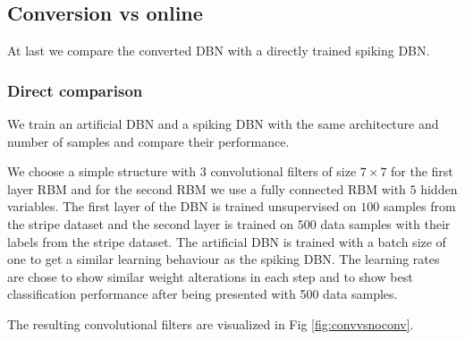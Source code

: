 \subsection{Conversion vs online} \label{c:comparisonexp}

At last we compare the converted DBN with a directly trained spiking DBN.

\subsubsection{Direct comparison}

We train an artificial DBN and a spiking DBN with the same architecture and number of samples and compare their performance.

We choose a simple structure with $3$ convolutional filters of size $7 \times 7$ for the first layer RBM and for the second RBM we use a fully connected RBM with $5$ hidden variables.
The first layer of the DBN is trained unsupervised on $100$ samples from the stripe dataset and the second layer is trained on $500$ data samples with their labels from the stripe dataset.
The artificial DBN is trained with a batch size of one to get a similar learning behaviour as the spiking DBN. 
The learning rates are chose to show similar weight alterations in each step and to show best classification performance after being presented with 500 data samples.

The resulting convolutional filters are visualized in Fig \ref{fig:convvsnoconv}. 

